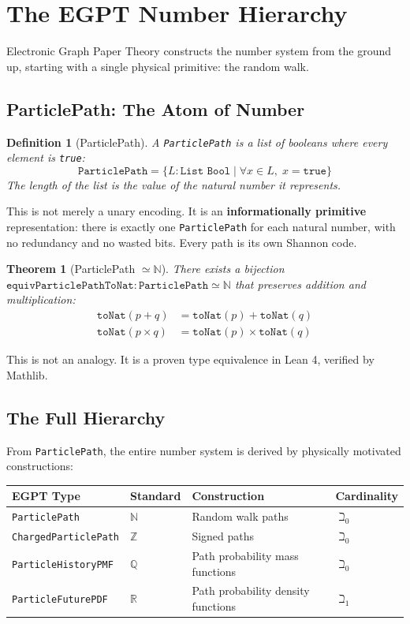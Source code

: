 \documentclass{report}
\newtheorem{theorem}{Theorem}
\newtheorem{definition}{Definition}
\begin{document}
\section{The EGPT Number Hierarchy}

Electronic Graph Paper Theory constructs the number system from the ground up,
starting with a single physical primitive: the random walk.

\subsection{ParticlePath: The Atom of Number}

\begin{definition}[ParticlePath]
A \texttt{ParticlePath} is a list of booleans where every element is
\texttt{true}:
$$\texttt{ParticlePath} = \{ L : \texttt{List Bool} \mid \forall x \in L,\; x = \texttt{true} \}$$
The length of the list is the value of the natural number it represents.
\end{definition}

This is not merely a unary encoding. It is an \textbf{informationally primitive}
representation: there is exactly one \texttt{ParticlePath} for each natural
number, with no redundancy and no wasted bits. Every path is its own Shannon
code.

\begin{theorem}[ParticlePath $\simeq \mathbb{N}$]
There exists a bijection $\texttt{equivParticlePathToNat} :
\texttt{ParticlePath} \simeq \mathbb{N}$ that preserves addition and
multiplication:
\begin{align*}
\texttt{toNat}(p + q) &= \texttt{toNat}(p) + \texttt{toNat}(q) \\
\texttt{toNat}(p \times q) &= \texttt{toNat}(p) \times \texttt{toNat}(q)
\end{align*}
\end{theorem}

This is not an analogy. It is a proven type equivalence in Lean 4, verified by
Mathlib.

\subsection{The Full Hierarchy}

From \texttt{ParticlePath}, the entire number system is derived by physically
motivated constructions:

\begin{center}
\begin{tabular}{llll}
\textbf{EGPT Type} & \textbf{Standard} & \textbf{Construction} & \textbf{Cardinality} \\
\hline
\texttt{ParticlePath} & $\mathbb{N}$ & Random walk paths & $\beth_0$ \\
\texttt{ChargedParticlePath} & $\mathbb{Z}$ & Signed paths & $\beth_0$ \\
\texttt{ParticleHistoryPMF} & $\mathbb{Q}$ & Path probability mass functions & $\beth_0$ \\
\texttt{ParticleFuturePDF} & $\mathbb{R}$ & Path probability density functions & $\beth_1$ \\
\end{tabular}
\end{center}
\end{document}
